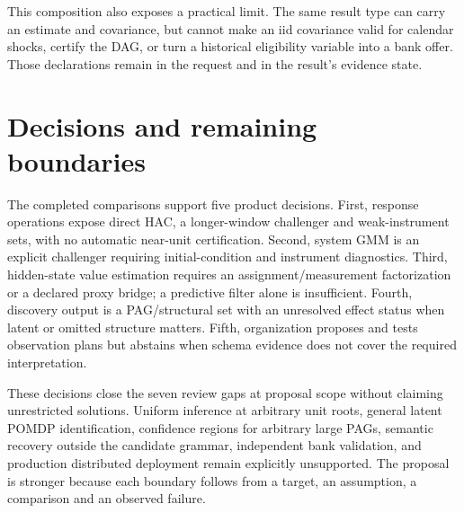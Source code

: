 This composition also exposes a practical limit. The same result type can
carry an estimate and covariance, but cannot make an iid covariance valid for
calendar shocks, certify the DAG, or turn a historical eligibility variable
into a bank offer. Those declarations remain in the request and in the
result's evidence state.

\section{Decisions and remaining boundaries}
\label{s5:scope-decisions}

The completed comparisons support five product decisions. First, response
operations expose direct HAC, a longer-window challenger and weak-instrument
sets, with no automatic near-unit certification. Second, system GMM is an
explicit challenger requiring initial-condition and instrument diagnostics.
Third, hidden-state value estimation requires an assignment/measurement
factorization or a declared proxy bridge; a predictive filter alone is
insufficient. Fourth, discovery output is a PAG/structural set with an
unresolved effect status when latent or omitted structure matters. Fifth,
organization proposes and tests observation plans but abstains when schema
evidence does not cover the required interpretation.

These decisions close the seven review gaps at proposal scope without claiming
unrestricted solutions. Uniform inference at arbitrary unit roots, general
latent POMDP identification, confidence regions for arbitrary large PAGs,
semantic recovery outside the candidate grammar, independent bank validation,
and production distributed deployment remain explicitly unsupported. The
proposal is stronger because each boundary follows from a target, an
assumption, a comparison and an observed failure.
